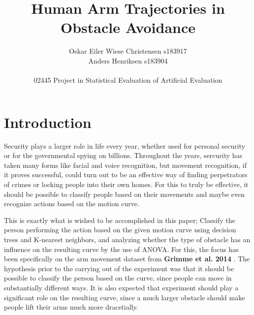 \documentclass[11pt, fleqn, titlepage]{article}
\title{Human Arm Trajectories in Obstacle Avoidance}
\author{Oskar Eiler Wiese Christensen s183917 \\ Anders Henriksen s183904 \\ \\ 02445 Project in Statistical Evaluation of Artificial Evaluation}
\date{\today \vspace{2.5cm} \section*{\small Summary} 
\justify{\footnotesize  Security and access authorization plays a big role in modern society. Improvement of these systems could be accomplished by using movement curves to identify the person and give access only to those with authority. The purpose of this paper is to investigate if it is possible to identify people based on movement curves by using two machine learning models, K-nearest neighbors and a binary decision tree, as well as to test if experiment has a significant effect on curve by using a bunch of ANOVAs. The results show that it is to some extent possible to predict person from curve and that KNN is most effective at this task. Meanwhile, experiment has a significant effect on curve. This implies that movement curves might be useful for classifying people if using more complicated machine learning models. Meanwhile, performing different actions lead to different curves, which has positive implications for the possibility of movement-based surveillance.}}
\begin{document}
\maketitle
\tableofcontents \newpage

\section{Introduction}
Security plays a larger role in life every year, whether used for personal security or for the governmental spying on billions. Throughout the years, sercurity has taken many forms like facial and voice recognition, but movement recognition, if it proves successful, could turn out to be an effective way of finding perpetrators of crimes or locking people into their own homes. For this to truly be effective, it should be possible to classify people based on their movements and maybe even recognize actions based on the motion curve.

This is exactly what is wished to be accomplished in this paper; Classify the person performing the action based on the given motion curve using decision trees and K-nearest neighbors, and analyzing whether the type of obstacle has an influence on the resulting curve by the use of ANOVA. For this, the focus has been specifically on the arm movement dataset from \textbf{Grimme et al. 2014} \cite{armdata}. The hypothesis prior to the carrying out of the experiment was that it should be possible to classify the person based on the curve, since people can move in substantially different ways. It is also expected that experiment should play a significant role on the resulting curve, since a much larger obstacle should make people lift their arms much more dracstially.
\end{document}
